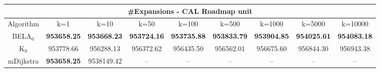 \begin{tabular}{c|cccccccc}\toprule
\multicolumn{9}{c}{#Expansions - CAL Roadmap unit}\\ \midrule
Algorithm & k=1 & k=10 & k=50 & k=100 & k=500 & k=1000 & k=5000 & k=10000 \\ \midrule
BELA$_0$ & \textbf{953658.25} & \textbf{953668.23} & \textbf{953724.16} & \textbf{953735.88} & \textbf{953833.79} & \textbf{953904.85} & \textbf{954025.61} & \textbf{954083.18} \\
K$_0$ & 953778.66 & 956288.13 & 956372.62 & 956435.50 & 956562.01 & 956675.60 & 956844.30 & 956943.38 \\
mDijkstra & \textbf{953658.25} & 9538149.42 & -- & -- & -- & -- & -- & -- \\ \bottomrule 
\end{tabular}
